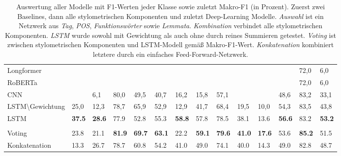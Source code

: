 \documentclass[bachelor,german]{info1thesis}
\begin{document}
\begin{table}[h!]
{\begin{tabular}{@{}llllllllllllll@{}}
\\
Longformer  &      &      &      &      &      &      &      &      &      &      &      & 72,0 & 6,0   \\
RoBERTa  &      &      &      &      &      &      &      &      &      &      &      & 72,0 & 6,0   \\
CNN               &      & 6,1  & 80,0 & 49,5 & 40,7 & 16,2 & 15,8 & 57,1 &      &      & 48,6 & 83,2 & 33,1  \\
LSTM\textbackslash Gewichtung & 25,0 & 12,3 & 78,7 & 65,9 & 52,9 & 12,9 & 41,7 & 68,4 & 19,5 & 10,0 & 54,3 & 83,5 & 43,8  \\
LSTM              & \textbf{37.5}	& \textbf{28.6}	& 77.9	& 52.8	& 55.3	& \textbf{58.8}	& 57.8	& 78.5	& 38.1	& 13.6	& \textbf{56.6}	& 83.2 & \textbf{53.2} \\
\\
Voting & 23.8	& 21.1	& \textbf{81.9}	& \textbf{69.7}	& \textbf{63.1}	& 22.2	& \textbf{59.1}	& \textbf{79.6}	& \textbf{41.0}	& \textbf{17.6}	& 53.6	& \textbf{85.2} & 51.5  \\
Konkatenation & 13.3	& 26.7	& 78.7	& 60.8	& 54.2	& 41.0	& 49.0	& 74.1	& 40.0	& 14.3	& 49.0	& 82.8 & 48.7 \\
 \bottomrule
\end{tabular}
}
\caption{Auswertung aller Modelle mit F1-Werten jeder Klasse sowie zuletzt Makro-F1 (in Prozent). Zuerst zwei Baselines, dann alle stylometrischen Komponenten und zuletzt Deep-Learning Modelle. \textit{Auswahl} ist ein Netzwerk aus \textit{Tag}, \textit{POS}, \textit{Funktionswörter} sowie \textit{Lemmata}. \textit{Kombination} verbindet alle stylometrischen Komponenten. \textit{LSTM} wurde sowohl mit Gewichtung als auch ohne durch reines Summieren getestet. \textit{Voting} ist zwischen stylometrischen Komponenten und LSTM-Modell gemäß Makro-F1-Wert. \textit{Konkatenation} kombiniert letztere durch ein einfaches Feed-Forward-Netzwerk.}
\label{tab:results}
\end{table}
%
\end{document}
